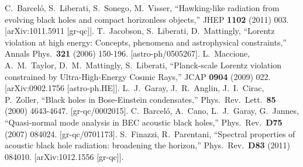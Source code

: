 \documentclass[12pt]{article}
\begin{document}
\begin{thebibliography}{666}
  C.~Barcel\'o, S.~Liberati, S.~Sonego, M.~Visser,
  ``Hawking-like radiation from evolving black holes and compact horizonless objects,''
  JHEP {\bf 1102 } (2011)  003.
  [arXiv:1011.5911 [gr-qc]].
  T.~Jacobson, S.~Liberati, D.~Mattingly,
  ``Lorentz violation at high energy: Concepts, phenomena and astrophysical constraints,''
  Annals Phys.\  {\bf 321 } (2006)  150-196.
  [astro-ph/0505267].
  L.~Maccione, A.~M.~Taylor, D.~M.~Mattingly, S.~Liberati,
  ``Planck-scale Lorentz violation constrained by Ultra-High-Energy Cosmic Rays,''
  JCAP {\bf 0904 } (2009)  022.
  [arXiv:0902.1756 [astro-ph.HE]].
  L.~J.~Garay, J.~R.~Anglin, J.~I.~Cirac, P.~Zoller,
  ``Black holes in Bose-Einstein condensates,''
  Phys.\ Rev.\ Lett.\  {\bf 85 } (2000)  4643-4647.
  [gr-qc/0002015].
  C.~Barcel\'o, A.~Cano, L.~J.~Garay, G.~Jannes,
  ``Quasi-normal mode analysis in BEC acoustic black holes,''
  Phys.\ Rev.\  {\bf D75 } (2007)  084024.
  [gr-qc/0701173].
  S.~Finazzi, R.~Parentani,
  ``Spectral properties of acoustic black hole radiation: broadening the horizon,''
  Phys.\ Rev.\  {\bf D83 } (2011)  084010.
  [arXiv:1012.1556 [gr-qc]].





\end{thebibliography}


\end{document}
